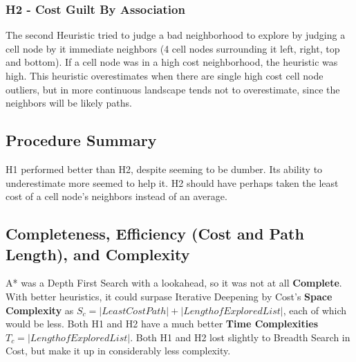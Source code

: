 \documentclass[12pt]{article}
\begin{document}
		\subsubsection{H2 - Cost Guilt By Association}
		The second Heuristic tried to judge a bad neighborhood to explore by judging a cell node by it immediate neighbors (4 cell nodes surrounding it left, right, top and bottom). If a cell node was in a high cost neighborhood, the heuristic was high. This heuristic overestimates when there are single high cost cell node outliers, but in more continuous landscape tends not to overestimate, since the neighbors will be likely paths.

	\subsection{Procedure Summary}
	H1 performed better than H2, despite seeming to be dumber. Its ability to underestimate more seemed to help it. H2 should have perhaps taken the least cost of a cell node's neighbors instead of an average. 

	\subsection{Completeness, Efficiency (Cost and Path Length), and Complexity}
	A* was a Depth First Search with a lookahead, so it was not at all \textbf{Complete}. With better heuristics, it could surpase Iterative Deepening by Cost's \textbf{Space Complexity} as $ S_c =  |Least Cost Path| + |Length of Explored List|$, each of which would be less. Both H1 and H2 have a much better \textbf{Time Complexities} $T_c = |Length of Explored List| $. Both H1 and H2 lost slightly to Breadth Search in Cost, but make it up in considerably less complexity.

	\pagebreak
\end{document}
